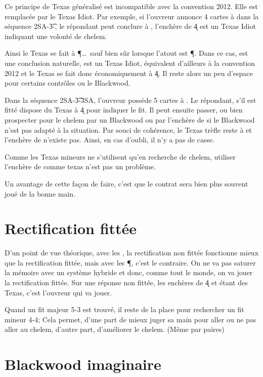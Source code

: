 \documentclass[a4paper,12pt]{article}
\begin{document}
Ce principe de Texas généralisé est incompatible avec la convention 2012. Elle est remplacée par le Texas Idiot. Par exemple, si l'ouvreur annonce 4 cartes à \C dans la séquence 2SA-\t3-, le répondant peut conclure à , l'enchère de \k4 est un Texas Idiot indiquant une volonté de chelem. 

Ainsi le Texas \T se fait à \P \dots\ sauf bien sûr lorsque l'atout est \P. Dans ce cas,  est une conclusion naturelle,  est un Texas Idiot, équivalent d'ailleurs à la convention 2012 et le Texas \T se fait donc économiquement à \k4. Il reste alors un peu d'espace pour certains contrôles ou le Blackwood.

Dans la séquence 2SA-\t3-3SA, l'ouvreur possède 5 cartes à \C. Le répondant, s'il est fitté dispose du Texas à \k4 pour indiquer le fit. Il peut ensuite passer, ou bien prospecter pour le chelem par un Blackwood ou par l'enchère de  si le Blackwood n'est pas adapté à la situation. Par souci de cohérence, le Texas trèfle reste à  et l'enchère de  n’existe pas. Ainsi, en cas d'oubli, il n'y a pas de casse.

Comme les Texas mineurs ne s'utilisent qu'en recherche de chelem, utiliser l'enchère de  comme texas \T n'est pas un problème.

Un avantage de cette façon de faire, c'est que le contrat sera bien plus souvent joué de la bonne main. 

\section*{Rectification fittée}

D'un point de vue théorique, avec les \C, la rectification non fittée fonctionne mieux que la rectification fittée, mais avec les \P, c'est le contraire. On ne va pas saturer la mémoire avec un système hybride et donc, comme tout le monde, on va jouer la rectification fittée. Sur une réponse non fittée, les enchères de \k4 et  étant des Texas, c'est l'ouvreur qui va jouer.

Quand un fit majeur 5-3 est trouvé, il reste de la place pour rechercher un fit mineur 4-4; Cela permet, d'une part de mieux juger sa main pour aller ou ne pas aller au chelem, d'autre part, d'améliorer le chelem. (Même par paires)


\section*{Blackwood imaginaire}
\end{document}
